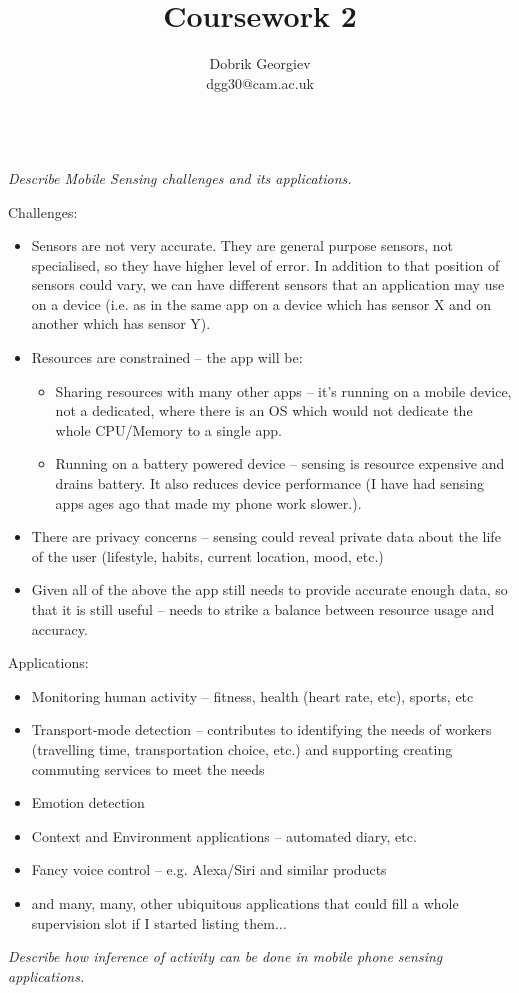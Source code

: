 \documentclass[12pt]{article}
\title{Coursework 2}
\author{Dobrik Georgiev \\ \small dgg30@cam.ac.uk}
\newcommand*\circled[1]{\tikz[baseline=(char.base)]{
		\node[shape=circle,draw,inner sep=0pt] (char) {#1};}}
\begin{document}
\maketitle
~\\
\textit{\circled{1.} Describe Mobile Sensing challenges and its applications.}

Challenges:
\begin{itemize}
    \item Sensors are not very accurate. They are general purpose sensors, not
        specialised, so they have higher level of error. In addition to that
        position of sensors could vary, we can have different sensors that an
        application may use on a device (i.e. as in the same app on a device
        which has sensor X and on another which has sensor Y).
    \item Resources are constrained -- the app will be:
        \begin{itemize}
            \item Sharing resources with many other apps -- it's running on
                a mobile device, not a dedicated, where there is an OS which
                would not dedicate the whole CPU/Memory to a single app.
            \item Running on a battery powered device -- sensing is resource
                expensive and drains battery. It also reduces device
                performance (I have had sensing apps ages ago that made my
                phone work slower.).
        \end{itemize}
    \item There are privacy concerns -- sensing could reveal private data about
        the life of the user (lifestyle, habits, current location, mood, etc.)
    \item Given all of the above the app still needs to provide accurate enough
        data, so that it is still useful -- needs to strike a balance between
        resource usage and accuracy.
\end{itemize}

Applications:
\begin{itemize}
    \item Monitoring human activity -- fitness, health (heart rate, etc), sports, etc
    \item Transport-mode detection -- contributes to identifying the needs of
        workers (travelling time, transportation choice, etc.) and supporting
        creating commuting services to meet the needs
    \item Emotion detection
    \item Context and Environment applications -- automated diary, etc.
    \item Fancy voice control -- e.g. Alexa/Siri and similar products
    \item and many, many, other ubiquitous applications that could fill a whole supervision slot if I started listing them$\dots$
\end{itemize}
\textit{\circled{2.} Describe how inference of activity can be done in mobile
phone sensing applications.}
\end{document}
